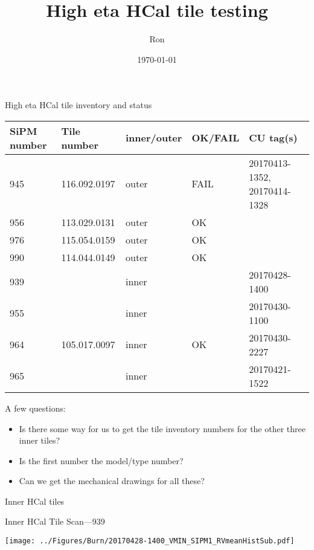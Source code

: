 \documentclass[compress,8pt]{beamer} %
\title[\today~-~Slide \insertframenumber]{High eta HCal tile testing}
\author[CU-Boulder]{Ron}
\date{\today}
\begin{document}


\begin{frame}
\titlepage
\end{frame}



\begin{frame}{High eta HCal tile inventory and status}
\begin{adjustwidth}{-3em}{-3em}
\begin{center}
\begin{tabular}{|lllll|}
\hline
SiPM number & Tile number & inner/outer & OK/FAIL & CU tag(s) \\
\hline
945 & 116.092.0197 & outer & FAIL & 20170413-1352, 20170414-1328 \\
956 & 113.029.0131 & outer & OK   &               \\
976 & 115.054.0159 & outer & OK   &  \\
990 & 114.044.0149 & outer & OK   &               \\
\hline
939 &              & inner &      & 20170428-1400 \\
955 &              & inner &      & 20170430-1100 \\
964 & 105.017.0097 & inner & OK   & 20170430-2227 \\
965 &              & inner &      & 20170421-1522 \\
\hline
\end{tabular}
\end{center}
\end{adjustwidth}
\vspace{10pt}
A few questions:
\begin{itemize}
\item Is there some way for us to get the tile inventory numbers for the other three inner tiles?
\item Is the first number the model/type number?
\item Can we get the mechanical drawings for all these?
\end{itemize}
\end{frame}



\begin{frame}
Inner HCal tiles
\end{frame}






\begin{frame}{Inner HCal Tile Scan---939}
\begin{adjustwidth}{-3em}{-3em}
\begin{center}
\texttt{[image: ../Figures/Burn/20170428-1400\_VMIN\_SIPM1\_RVmeanHistSub.pdf]}
\end{center}
\end{adjustwidth}
\end{frame}
\end{document}
